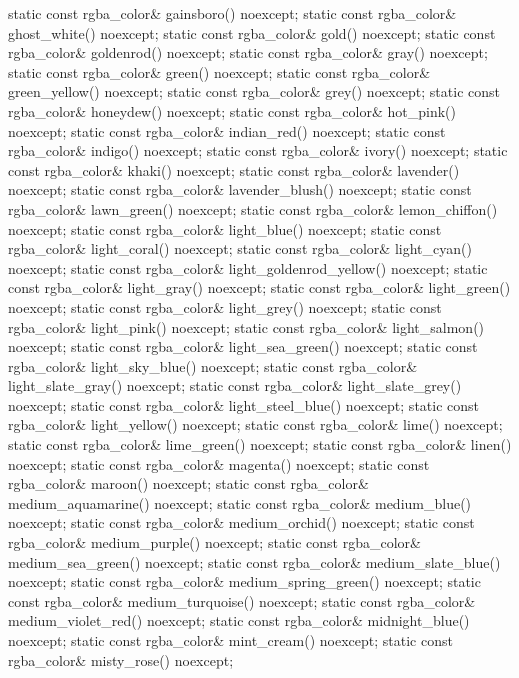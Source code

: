 \begin{codeblock}
{{{{{    static const rgba_color& gainsboro() noexcept;
    static const rgba_color& ghost_white() noexcept;
    static const rgba_color& gold() noexcept;
    static const rgba_color& goldenrod() noexcept;
    static const rgba_color& gray() noexcept;
    static const rgba_color& green() noexcept;
    static const rgba_color& green_yellow() noexcept;
    static const rgba_color& grey() noexcept;
    static const rgba_color& honeydew() noexcept;
    static const rgba_color& hot_pink() noexcept;
    static const rgba_color& indian_red() noexcept;
    static const rgba_color& indigo() noexcept;
    static const rgba_color& ivory() noexcept;
    static const rgba_color& khaki() noexcept;
    static const rgba_color& lavender() noexcept;
    static const rgba_color& lavender_blush() noexcept;
    static const rgba_color& lawn_green() noexcept;
    static const rgba_color& lemon_chiffon() noexcept;
    static const rgba_color& light_blue() noexcept;
    static const rgba_color& light_coral() noexcept;
    static const rgba_color& light_cyan() noexcept;
    static const rgba_color& light_goldenrod_yellow() noexcept;
    static const rgba_color& light_gray() noexcept;
    static const rgba_color& light_green() noexcept;
    static const rgba_color& light_grey() noexcept;
    static const rgba_color& light_pink() noexcept;
    static const rgba_color& light_salmon() noexcept;
    static const rgba_color& light_sea_green() noexcept;
    static const rgba_color& light_sky_blue() noexcept;
    static const rgba_color& light_slate_gray() noexcept;
    static const rgba_color& light_slate_grey() noexcept;
    static const rgba_color& light_steel_blue() noexcept;
    static const rgba_color& light_yellow() noexcept;
    static const rgba_color& lime() noexcept;
    static const rgba_color& lime_green() noexcept;
    static const rgba_color& linen() noexcept;
    static const rgba_color& magenta() noexcept;
    static const rgba_color& maroon() noexcept;
    static const rgba_color& medium_aquamarine() noexcept;
    static const rgba_color& medium_blue() noexcept;
    static const rgba_color& medium_orchid() noexcept;
    static const rgba_color& medium_purple() noexcept;
    static const rgba_color& medium_sea_green() noexcept;
    static const rgba_color& medium_slate_blue() noexcept;
    static const rgba_color& medium_spring_green() noexcept;
    static const rgba_color& medium_turquoise() noexcept;
    static const rgba_color& medium_violet_red() noexcept;
    static const rgba_color& midnight_blue() noexcept;
    static const rgba_color& mint_cream() noexcept;
    static const rgba_color& misty_rose() noexcept;
}}}}}
\end{codeblock}
